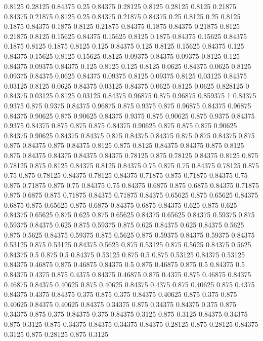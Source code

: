 0.8125 0.28125
0.84375 0.25
0.84375 0.28125
0.8125 0.28125
0.8125 0.21875
0.84375 0.21875
0.8125 0.25
0.84375 0.21875
0.84375 0.25
0.8125 0.25
0.8125 0.1875
0.84375 0.1875
0.8125 0.21875
0.84375 0.1875
0.84375 0.21875
0.8125 0.21875
0.8125 0.15625
0.84375 0.15625
0.8125 0.1875
0.84375 0.15625
0.84375 0.1875
0.8125 0.1875
0.8125 0.125
0.84375 0.125
0.8125 0.15625
0.84375 0.125
0.84375 0.15625
0.8125 0.15625
0.8125 0.09375
0.84375 0.09375
0.8125 0.125
0.84375 0.09375
0.84375 0.125
0.8125 0.125
0.8125 0.0625
0.84375 0.0625
0.8125 0.09375
0.84375 0.0625
0.84375 0.09375
0.8125 0.09375
0.8125 0.03125
0.84375 0.03125
0.8125 0.0625
0.84375 0.03125
0.84375 0.0625
0.8125 0.0625
0.828125 0
0.84375 0.03125
0.8125 0.03125
0.84375 0.96875
0.875 0.96875
0.859375 1
0.84375 0.9375
0.875 0.9375
0.84375 0.96875
0.875 0.9375
0.875 0.96875
0.84375 0.96875
0.84375 0.90625
0.875 0.90625
0.84375 0.9375
0.875 0.90625
0.875 0.9375
0.84375 0.9375
0.84375 0.875
0.875 0.875
0.84375 0.90625
0.875 0.875
0.875 0.90625
0.84375 0.90625
0.84375 0.84375
0.875 0.84375
0.84375 0.875
0.875 0.84375
0.875 0.875
0.84375 0.875
0.84375 0.8125
0.875 0.8125
0.84375 0.84375
0.875 0.8125
0.875 0.84375
0.84375 0.84375
0.84375 0.78125
0.875 0.78125
0.84375 0.8125
0.875 0.78125
0.875 0.8125
0.84375 0.8125
0.84375 0.75
0.875 0.75
0.84375 0.78125
0.875 0.75
0.875 0.78125
0.84375 0.78125
0.84375 0.71875
0.875 0.71875
0.84375 0.75
0.875 0.71875
0.875 0.75
0.84375 0.75
0.84375 0.6875
0.875 0.6875
0.84375 0.71875
0.875 0.6875
0.875 0.71875
0.84375 0.71875
0.84375 0.65625
0.875 0.65625
0.84375 0.6875
0.875 0.65625
0.875 0.6875
0.84375 0.6875
0.84375 0.625
0.875 0.625
0.84375 0.65625
0.875 0.625
0.875 0.65625
0.84375 0.65625
0.84375 0.59375
0.875 0.59375
0.84375 0.625
0.875 0.59375
0.875 0.625
0.84375 0.625
0.84375 0.5625
0.875 0.5625
0.84375 0.59375
0.875 0.5625
0.875 0.59375
0.84375 0.59375
0.84375 0.53125
0.875 0.53125
0.84375 0.5625
0.875 0.53125
0.875 0.5625
0.84375 0.5625
0.84375 0.5
0.875 0.5
0.84375 0.53125
0.875 0.5
0.875 0.53125
0.84375 0.53125
0.84375 0.46875
0.875 0.46875
0.84375 0.5
0.875 0.46875
0.875 0.5
0.84375 0.5
0.84375 0.4375
0.875 0.4375
0.84375 0.46875
0.875 0.4375
0.875 0.46875
0.84375 0.46875
0.84375 0.40625
0.875 0.40625
0.84375 0.4375
0.875 0.40625
0.875 0.4375
0.84375 0.4375
0.84375 0.375
0.875 0.375
0.84375 0.40625
0.875 0.375
0.875 0.40625
0.84375 0.40625
0.84375 0.34375
0.875 0.34375
0.84375 0.375
0.875 0.34375
0.875 0.375
0.84375 0.375
0.84375 0.3125
0.875 0.3125
0.84375 0.34375
0.875 0.3125
0.875 0.34375
0.84375 0.34375
0.84375 0.28125
0.875 0.28125
0.84375 0.3125
0.875 0.28125
0.875 0.3125
